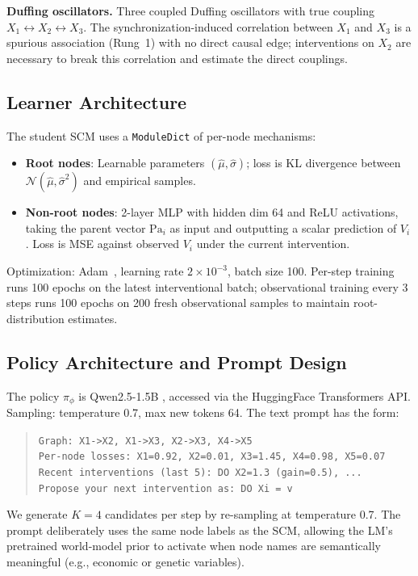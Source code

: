 \textbf{Duffing oscillators.} Three coupled Duffing oscillators with true coupling $X_1 \leftrightarrow X_2 \leftrightarrow X_3$. The synchronization-induced correlation between $X_1$ and $X_3$ is a spurious association (Rung~1) with no direct causal edge; interventions on $X_2$ are necessary to break this correlation and estimate the direct couplings.

\subsection{Learner Architecture}
\label{app:learner}

The student SCM uses a \texttt{ModuleDict} of per-node mechanisms:
\begin{itemize}[leftmargin=1.2em,topsep=0.2em,itemsep=0.1em]
\item \textbf{Root nodes}: Learnable parameters $(\hat{\mu}, \hat{\sigma})$; loss is KL divergence between $\mathcal{N}(\hat{\mu}, \hat{\sigma}^2)$ and empirical samples.
\item \textbf{Non-root nodes}: 2-layer MLP with hidden dim 64 and ReLU activations, taking the parent vector $\text{Pa}_i$ as input and outputting a scalar prediction of $V_i$. Loss is MSE against observed $V_i$ under the current intervention.
\end{itemize}
Optimization: Adam~\citep{kingma2015adam}, learning rate $2 \times 10^{-3}$, batch size 100. Per-step training runs 100 epochs on the latest interventional batch; observational training every 3 steps runs 100 epochs on 200 fresh observational samples to maintain root-distribution estimates.

\subsection{Policy Architecture and Prompt Design}
\label{app:policy}

The policy $\pi_\phi$ is Qwen2.5-1.5B \citep{qwen2_5}, accessed via the HuggingFace Transformers API. Sampling: temperature 0.7, max new tokens 64. The text prompt has the form:
\begin{quote}\small
\texttt{Graph: X1->X2, X1->X3, X2->X3, X4->X5}\\
\texttt{Per-node losses: X1=0.92, X2=0.01, X3=1.45, X4=0.98, X5=0.07}\\
\texttt{Recent interventions (last 5): DO X2=1.3 (gain=0.5), ...}\\
\texttt{Propose your next intervention as: DO Xi = v}
\end{quote}
We generate $K = 4$ candidates per step by re-sampling at temperature 0.7. The prompt deliberately uses the same node labels as the SCM, allowing the LM's pretrained world-model prior to activate when node names are semantically meaningful (e.g., economic or genetic variables).

